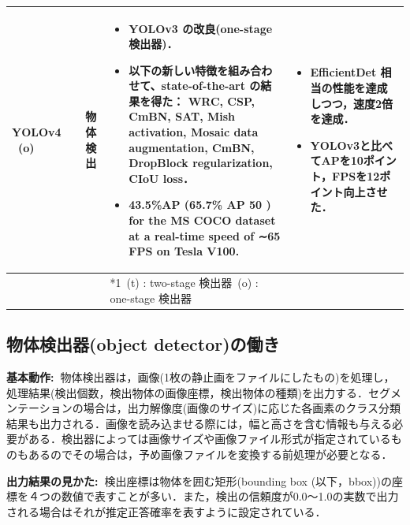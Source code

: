 \documentclass[originalpaper,fleqn]{jsaiart}     %
\begin{document}
\begin{table}
\begin{center}
\begin{tabularx}{\linewidth}{Xp{1.5cm}Xp{7cm}X}
            YOLOv4 \ (o) & \cite{BWL20} & 物体検出 & 
            \begin{itemize}
                \vspace{-0.7\baselineskip}
                \setlength{\leftskip}{-3mm}
                \item YOLOv3 の改良(one-stage 検出器)．
                \item 以下の新しい特徴を組み合わせて、state-of-the-art の結果を得た： WRC, CSP, CmBN, SAT, Mish activation, Mosaic data augmentation, CmBN, DropBlock regularization, CIoU loss．
                \item 43.5\%AP (65.7\% AP 50 ) for the MS COCO dataset at a real-time speed of ∼65 FPS on Tesla V100.
            \end{itemize}
            &
            \begin{itemize}
                \vspace{-0.7\baselineskip}
                \setlength{\leftskip}{-3mm}
                \item EfficientDet 相当の性能を達成しつつ，速度2倍を達成．
                \item YOLOv3と比べてAPを10ポイント，FPSを12ポイント向上させた．
            \end{itemize}
            \\
            \bottomrule
             &  &  & *1\ (t) : two-stage 検出器\quad *2\ (o) : one-stage 検出器 &  \\
        \end{tabularx}
    \end{center}
\end{table}%

\subsection{物体検出器(object detector)の働き}
{\bf 基本動作:\ }物体検出器は，画像(1枚の静止画をファイルにしたもの)を処理し，処理結果(検出個数，検出物体の画像座標，検出物体の種類)を出力する．セグメンテーションの場合は，出力解像度(画像のサイズ)に応じた各画素のクラス分類結果も出力される．画像を読み込ませる際には，幅と高さを含む情報も与える必要がある．検出器によっては画像サイズや画像ファイル形式が指定されているものもあるのでその場合は，予め画像ファイルを変換する前処理が必要となる．

{\bf 出力結果の見かた:\ }検出座標は物体を囲む矩形(bounding box (以下，bbox))の座標を４つの数値で表すことが多い．また，検出の信頼度が0.0〜1.0の実数で出力される場合はそれが推定正答確率を表すように設定されている．
\end{document}
